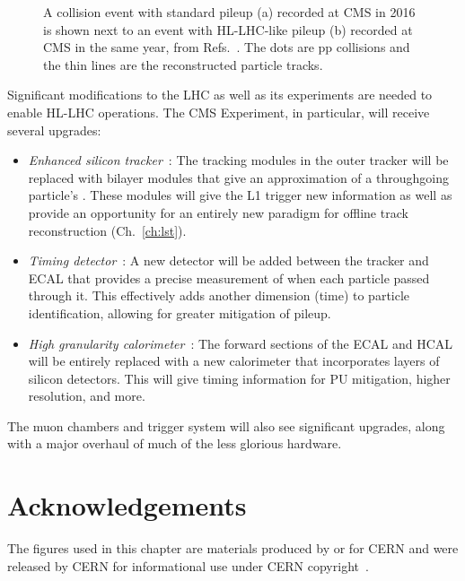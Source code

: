 \begin{figure}[!htb]
    \centering
    \qquad
    \caption[A collision event with standard pileup and with HL-LHC-like pileup, both recorded in 2016]{
        A collision event with standard pileup (a) recorded at CMS in 2016 is shown next to an event with HL-LHC-like pileup (b) recorded at CMS in the same year, from Refs.~\cite{NormalPU2016, HighPU2016}.
        The dots are pp collisions and the thin lines are the reconstructed particle tracks.
    }
    \label{fig:pileup}
\end{figure}

Significant modifications to the LHC as well as its experiments are needed to enable HL-LHC operations. 
The CMS Experiment, in particular, will receive several upgrades: 
\begin{itemize}
    \item{
        \textit{Enhanced silicon tracker}~\cite{CERN-LHCC-2017-009}: 
        The tracking modules in the outer tracker will be replaced with bilayer modules that give an approximation of a throughgoing particle's \pt. 
        These modules will give the L1 trigger new information as well as provide an opportunity for an entirely new paradigm for offline track reconstruction (Ch.~\ref{ch:lst}). 
    }
    \item{
        \textit{Timing detector}~\cite{CERN-LHCC-2017-027}: 
        A new detector will be added between the tracker and ECAL that provides a precise measurement of when each particle passed through it. 
        This effectively adds another dimension (time) to particle identification, allowing for greater mitigation of pileup. 
    }
    \item{
            \textit{High granularity calorimeter}~\cite{CERN-LHCC-2017-023, CERN-LHCC-2017-011}: 
        The forward sections of the ECAL and HCAL will be entirely replaced with a new calorimeter that incorporates layers of silicon detectors. 
        This will give timing information for PU mitigation, higher resolution, and more. 
    }
\end{itemize}
The muon chambers and trigger system will also see significant upgrades, along with a major overhaul of much of the less glorious hardware.

\section{Acknowledgements}
The figures used in this chapter are materials produced by or for CERN and were released by CERN for informational use under CERN copyright~\cite{CERNCopyright}. 
